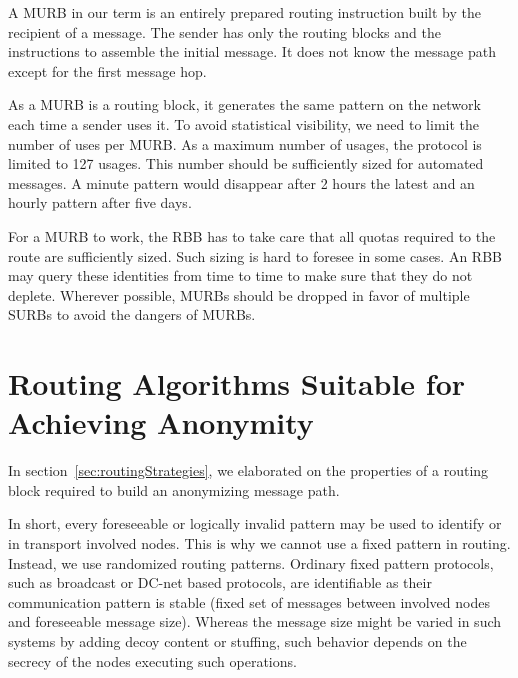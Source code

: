A MURB in our term is an entirely prepared routing instruction built by the recipient of a message. The sender has only the routing blocks and the instructions to assemble the initial message. It does not know the message path except for the first message hop.

As a MURB is a routing block, it generates the same pattern on the network each time a sender uses it. To avoid statistical visibility, we need to limit the number of uses per MURB. As a maximum number of usages, the protocol is limited to 127 usages. This number should be sufficiently sized for automated messages. A minute pattern would disappear after 2 hours the latest and an hourly pattern after five days.

For a MURB to work, the RBB has to take care that all quotas required to the route are sufficiently sized. Such sizing is hard to foresee in some cases. An RBB may query these identities from time to time to make sure that they do not deplete. Wherever possible, MURBs should be dropped in favor of multiple SURBs to avoid the dangers of MURBs.

\section{Routing Algorithms Suitable for Achieving Anonymity\label{sec:routingStrategies}}
In section~\ref{sec:routingStrategies}, we elaborated on the properties of a routing block required to build an anonymizing message path.

In short, every foreseeable or logically invalid pattern may be used to identify \VortexMessages{} or in transport involved nodes. This is why we cannot use a fixed pattern in routing. Instead, we use randomized routing patterns. Ordinary fixed pattern protocols, such as broadcast or DC-net based protocols, are identifiable as their communication pattern is stable (fixed set of messages between involved nodes and foreseeable message size). Whereas the message size might be varied in such systems by adding decoy content or stuffing, such behavior depends on the secrecy of the nodes executing such operations.

